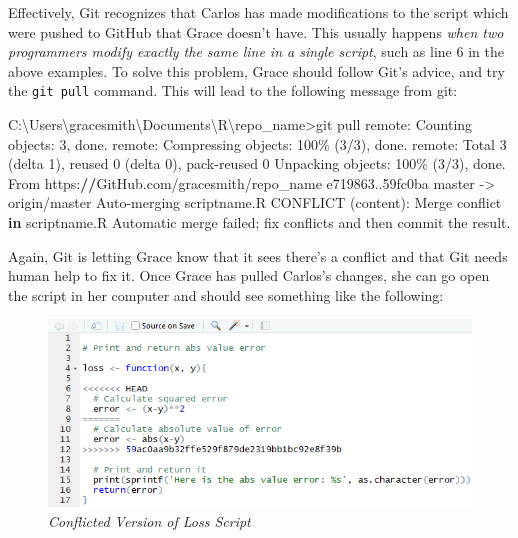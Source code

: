 \documentclass[
]{book}
\newenvironment{Shaded}{\begin{snugshade}}{\end{snugshade}}
\newcommand{\ControlFlowTok}[1]{\textcolor[rgb]{0.13,0.29,0.53}{\textbf{#1}}}
\newcommand{\DecValTok}[1]{\textcolor[rgb]{0.00,0.00,0.81}{#1}}
\newcommand{\ErrorTok}[1]{\textcolor[rgb]{0.64,0.00,0.00}{\textbf{#1}}}
\newcommand{\FunctionTok}[1]{\textcolor[rgb]{0.00,0.00,0.00}{#1}}
\newcommand{\NormalTok}[1]{#1}
\newcommand{\OtherTok}[1]{\textcolor[rgb]{0.56,0.35,0.01}{#1}}
\newcommand{\SpecialCharTok}[1]{\textcolor[rgb]{0.00,0.00,0.00}{#1}}
\begin{document}
Effectively, Git recognizes that Carlos has made modifications to the script which were pushed to GitHub that Grace doesn't have. This usually happens \emph{when two programmers modify exactly the same line in a single script}, such as line 6 in the above examples. To solve this problem, Grace should follow Git's advice, and try the \texttt{git\ pull} command. This will lead to the following message from git:

\begin{Shaded}
\begin{Highlighting}[]
\NormalTok{C}\SpecialCharTok{:}\NormalTok{\textbackslash{}Users\textbackslash{}gracesmith\textbackslash{}Documents\textbackslash{}R\textbackslash{}repo\_name}\SpecialCharTok{\textgreater{}}\NormalTok{git pull}
\NormalTok{remote}\SpecialCharTok{:}\NormalTok{ Counting objects}\SpecialCharTok{:} \DecValTok{3}\NormalTok{, done.}
\NormalTok{remote}\SpecialCharTok{:}\NormalTok{ Compressing objects}\SpecialCharTok{:} \DecValTok{100}\NormalTok{\% (}\DecValTok{3}\SpecialCharTok{/}\DecValTok{3}\NormalTok{), done.}
\NormalTok{remote}\SpecialCharTok{:}\NormalTok{ Total }\DecValTok{3}\NormalTok{ (delta }\DecValTok{1}\NormalTok{), reused }\DecValTok{0}\NormalTok{ (delta }\DecValTok{0}\NormalTok{), pack}\SpecialCharTok{{-}}\NormalTok{reused }\DecValTok{0}
\NormalTok{Unpacking objects}\SpecialCharTok{:} \DecValTok{100}\NormalTok{\% (}\DecValTok{3}\SpecialCharTok{/}\DecValTok{3}\NormalTok{), done.}
\NormalTok{From https}\SpecialCharTok{:}\ErrorTok{//}\NormalTok{GitHub.com}\SpecialCharTok{/}\NormalTok{gracesmith}\SpecialCharTok{/}\NormalTok{repo\_name}
\NormalTok{   e719863..59fc0ba  master     }\OtherTok{{-}\textgreater{}}\NormalTok{ origin}\SpecialCharTok{/}\NormalTok{master}
\NormalTok{Auto}\SpecialCharTok{{-}}\NormalTok{merging scriptname.R}
\FunctionTok{CONFLICT}\NormalTok{ (content)}\SpecialCharTok{:}\NormalTok{ Merge conflict }\ControlFlowTok{in}\NormalTok{ scriptname.R}
\NormalTok{Automatic merge failed; fix conflicts and then commit the result.}
\end{Highlighting}
\end{Shaded}

Again, Git is letting Grace know that it sees there's a conflict and that Git needs human help to fix it. Once Grace has pulled Carlos's changes, she can go open the script in her computer and should see something like the following:

\begin{figure}
\centering
\includegraphics{images/lossConflict.PNG}
\caption{\emph{Conflicted Version of Loss Script}}
\end{figure}
\end{document}
